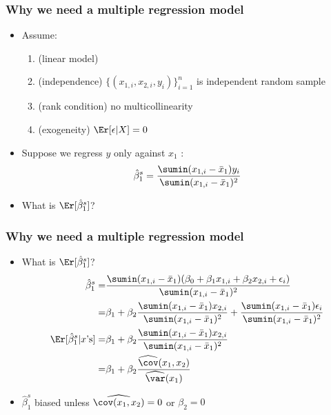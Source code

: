 \begin{frame}[allowframebreaks]
  \frametitle{Why we need a multiple regression model}
  \begin{itemize}
  \item   Assume:
    \begin{enumerate}
    \item[MLR.1] (linear model) 
    \item[MLR.2] (independence) $\{(x_{1,i},x_{2,i},y_i)\}_{i=1}^n$ is independent random
      sample
    \item[MLR.3] (rank condition) no multicollinearity
    \item[MLR.4] (exogeneity) $\Er[\epsilon | X] = 0$
    \end{enumerate}
  \item Suppose we regress $y$ only against $x_1$ :
    \[ \hat{\beta}_1^s = \frac{\sumin (x_{1,i} - \bar{x}_1)y_i}{\sumin
        (x_{1,i} - \bar{x}_1)^2 } \]
  \item What is $\Er[\hat{\beta}_1^s]$?
  \end{itemize}
\end{frame}

\begin{frame}
    \frametitle{Why we need a multiple regression model}
    \begin{itemize}
    \item What is $\Er[\hat{\beta}_1^s]$?
      \begin{align*}
      \hat{\beta}_1^s = & \frac{\sumin (x_{1,i} - \bar{x}_1)(\beta_0 +
        \beta_1 x_{1,i} + \beta_2 x_{2,i} + \epsilon_i)} {\sumin
        (x_{1,i} - \bar{x}_1)^2 } \\ 
      = & \beta_1 + \beta_2 \frac{\sumin (x_{1,i} - \bar{x}_1)
        x_{2,i}} {\sumin (x_{1,i} - \bar{x}_1)^2 } +
      \frac{\sumin (x_{1,i} - \bar{x}_1)
        \epsilon_{i}} {\sumin (x_{1,i} - \bar{x}_1)^2 } \\
      \Er[\hat{\beta}_1^s|x\text{'s}] = & \beta_1 + \beta_2 \frac{\sumin (x_{1,i} - \bar{x}_1)
        x_{2,i}} {\sumin (x_{1,i} - \bar{x}_1)^2 } \\
      = & \beta_1 + \beta_2
      \frac{\widehat{\cov}(x_1,x_2)}{\widehat{\var}(x_1)} 
    \end{align*}
  \item $\hat{\beta}_1^s$ biased unless $\widehat{\cov(x_1,x_2)} = 0$
    or $\beta_2 = 0$
  \end{itemize}
\end{frame}

